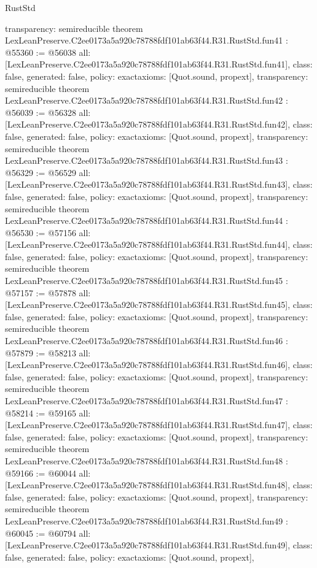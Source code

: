 \begin{lexlean}{RustStd}
\begin{coremodule}
{  transparency: semireducible
}
theorem LexLeanPreserve.C2ee0173a5a920c78788fdf101ab63f44.R31.RustStd.fun41 : @55360 := @56038 {
  all: [LexLeanPreserve.C2ee0173a5a920c78788fdf101ab63f44.R31.RustStd.fun41],
  class: false,
  generated: false,
  policy: exact{axioms: [Quot.sound, propext]},
  transparency: semireducible
}
theorem LexLeanPreserve.C2ee0173a5a920c78788fdf101ab63f44.R31.RustStd.fun42 : @56039 := @56328 {
  all: [LexLeanPreserve.C2ee0173a5a920c78788fdf101ab63f44.R31.RustStd.fun42],
  class: false,
  generated: false,
  policy: exact{axioms: [Quot.sound, propext]},
  transparency: semireducible
}
theorem LexLeanPreserve.C2ee0173a5a920c78788fdf101ab63f44.R31.RustStd.fun43 : @56329 := @56529 {
  all: [LexLeanPreserve.C2ee0173a5a920c78788fdf101ab63f44.R31.RustStd.fun43],
  class: false,
  generated: false,
  policy: exact{axioms: [Quot.sound, propext]},
  transparency: semireducible
}
theorem LexLeanPreserve.C2ee0173a5a920c78788fdf101ab63f44.R31.RustStd.fun44 : @56530 := @57156 {
  all: [LexLeanPreserve.C2ee0173a5a920c78788fdf101ab63f44.R31.RustStd.fun44],
  class: false,
  generated: false,
  policy: exact{axioms: [Quot.sound, propext]},
  transparency: semireducible
}
theorem LexLeanPreserve.C2ee0173a5a920c78788fdf101ab63f44.R31.RustStd.fun45 : @57157 := @57878 {
  all: [LexLeanPreserve.C2ee0173a5a920c78788fdf101ab63f44.R31.RustStd.fun45],
  class: false,
  generated: false,
  policy: exact{axioms: [Quot.sound, propext]},
  transparency: semireducible
}
theorem LexLeanPreserve.C2ee0173a5a920c78788fdf101ab63f44.R31.RustStd.fun46 : @57879 := @58213 {
  all: [LexLeanPreserve.C2ee0173a5a920c78788fdf101ab63f44.R31.RustStd.fun46],
  class: false,
  generated: false,
  policy: exact{axioms: [Quot.sound, propext]},
  transparency: semireducible
}
theorem LexLeanPreserve.C2ee0173a5a920c78788fdf101ab63f44.R31.RustStd.fun47 : @58214 := @59165 {
  all: [LexLeanPreserve.C2ee0173a5a920c78788fdf101ab63f44.R31.RustStd.fun47],
  class: false,
  generated: false,
  policy: exact{axioms: [Quot.sound, propext]},
  transparency: semireducible
}
theorem LexLeanPreserve.C2ee0173a5a920c78788fdf101ab63f44.R31.RustStd.fun48 : @59166 := @60044 {
  all: [LexLeanPreserve.C2ee0173a5a920c78788fdf101ab63f44.R31.RustStd.fun48],
  class: false,
  generated: false,
  policy: exact{axioms: [Quot.sound, propext]},
  transparency: semireducible
}
theorem LexLeanPreserve.C2ee0173a5a920c78788fdf101ab63f44.R31.RustStd.fun49 : @60045 := @60794 {
  all: [LexLeanPreserve.C2ee0173a5a920c78788fdf101ab63f44.R31.RustStd.fun49],
  class: false,
  generated: false,
  policy: exact{axioms: [Quot.sound, propext]},
}
\end{coremodule}
\end{lexlean}
